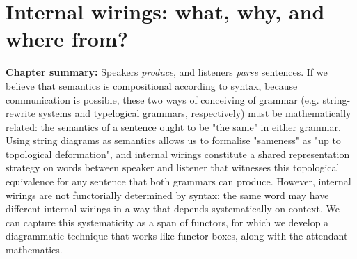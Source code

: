 



\maketitle%

\tableofcontents{}

\setcounter{chapter}{-1}
\chapter{Internal wirings: what, why, and where from?}
\textbf{Chapter summary:} Speakers \emph{produce}, and listeners \emph{parse} sentences. If we believe that semantics is compositional according to syntax, because communication is possible, these two ways of conceiving of grammar (e.g. string-rewrite systems and typelogical grammars, respectively) must be mathematically related: the semantics of a sentence ought to be "the same" in either grammar. Using string diagrams as semantics allows us to formalise "sameness" as "up to topological deformation", and internal wirings constitute a shared representation strategy on words between speaker and listener that witnesses this topological equivalence for any sentence that both grammars can produce. However, internal wirings are not functorially determined by syntax: the same word may have different internal wirings in a way that depends systematically on context. We can capture this systematicity as a span of functors, for which we develop a diagrammatic technique that works like functor boxes, along with the attendant mathematics.
\newpage








